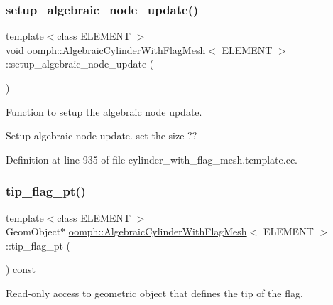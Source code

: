 \subsubsection{\texorpdfstring{setup\+\_\+algebraic\+\_\+node\+\_\+update()}{setup\_algebraic\_node\_update()}}
{\footnotesize\ttfamily template$<$class E\+L\+E\+M\+E\+NT $>$ \\
void \hyperlink{classoomph_1_1AlgebraicCylinderWithFlagMesh}{oomph\+::\+Algebraic\+Cylinder\+With\+Flag\+Mesh}$<$ E\+L\+E\+M\+E\+NT $>$\+::setup\+\_\+algebraic\+\_\+node\+\_\+update (\begin{DoxyParamCaption}{ }\end{DoxyParamCaption})\hspace{0.3cm}{\ttfamily [protected]}}



Function to setup the algebraic node update. 

Setup algebraic node update. set the size ?? 

Definition at line 935 of file cylinder\+\_\+with\+\_\+flag\+\_\+mesh.\+template.\+cc.

\mbox{\label{classoomph_1_1AlgebraicCylinderWithFlagMesh_ad6d22aaa02d79e3c740b06d98a1597ea}} 
\subsubsection{\texorpdfstring{tip\+\_\+flag\+\_\+pt()}{tip\_flag\_pt()}}
{\footnotesize\ttfamily template$<$class E\+L\+E\+M\+E\+NT $>$ \\
Geom\+Object$\ast$ \hyperlink{classoomph_1_1AlgebraicCylinderWithFlagMesh}{oomph\+::\+Algebraic\+Cylinder\+With\+Flag\+Mesh}$<$ E\+L\+E\+M\+E\+NT $>$\+::tip\+\_\+flag\+\_\+pt (\begin{DoxyParamCaption}{ }\end{DoxyParamCaption}) const\hspace{0.3cm}{\ttfamily [inline]}}



Read-\/only access to geometric object that defines the tip of the flag. 



